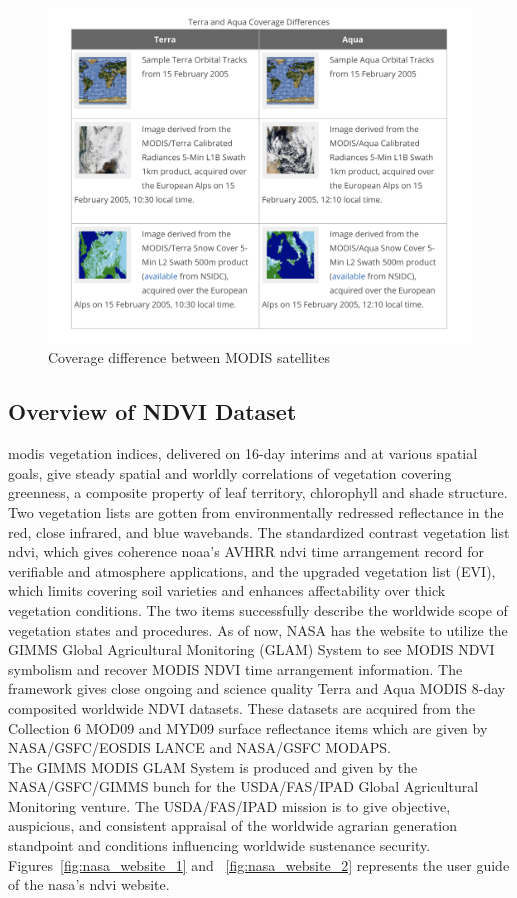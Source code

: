     \begin{figure}[H]
            \centering
            \includegraphics[width=1.0\linewidth]{figures/ch3/satellites.png}
            \caption{\label{fig:modis_satellites_difference} Coverage difference between MODIS satellites \cite{NSIDC}}
    \end{figure}

\subsection{Overview of NDVI Dataset}

\gls{modis} vegetation indices, delivered on 16-day interims and at various spatial goals, give steady spatial and worldly correlations of vegetation covering greenness, a composite property of leaf territory, chlorophyll and shade structure. Two vegetation lists are gotten from environmentally redressed reflectance in the red, close infrared, and blue wavebands. The standardized contrast vegetation list \gls{ndvi}, which gives coherence \gls{noaa}'s AVHRR \gls{ndvi} time arrangement record for verifiable and atmosphere applications, and the upgraded vegetation list (EVI), which limits covering soil varieties and enhances affectability over thick vegetation conditions. The two items successfully describe the worldwide scope of vegetation states and procedures. As of now, NASA has the website to utilize the GIMMS Global Agricultural Monitoring (GLAM) System to see MODIS NDVI symbolism and recover MODIS NDVI time arrangement information. The framework gives close ongoing and science quality Terra and Aqua MODIS 8-day composited worldwide NDVI datasets. These datasets are acquired from the Collection 6 MOD09 and MYD09 surface reflectance items which are given by NASA/GSFC/EOSDIS LANCE and NASA/GSFC MODAPS. \\
The GIMMS MODIS GLAM System is produced and given by the NASA/GSFC/GIMMS bunch for the USDA/FAS/IPAD Global Agricultural Monitoring venture. The USDA/FAS/IPAD mission is to give objective, auspicious, and consistent appraisal of the worldwide agrarian generation standpoint and conditions influencing worldwide sustenance security. Figures~\ref{fig:nasa_website_1} and ~\ref{fig:nasa_website_2} represents the user guide of the \gls{nasa}'s \gls{ndvi} website.

